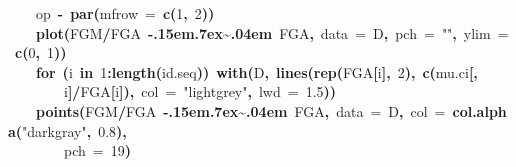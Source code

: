 \documentclass{article}
\makeatletter
\newcommand{\hlnumber}[1]{\textcolor[rgb]{0,0,0}{#1}}%
\newcommand{\hlfunctioncall}[1]{\textcolor[rgb]{.5,0,.33}{\textbf{#1}}}%
\newcommand{\hlstring}[1]{\textcolor[rgb]{.6,.6,1}{#1}}%
\newcommand{\hlkeyword}[1]{\textbf{#1}}%
\newcommand{\hlargument}[1]{\textcolor[rgb]{.69,.25,.02}{#1}}%
\newcommand{\hlassignement}[1]{\textbf{#1}}%
\newcommand{\hlsymbol}[1]{#1}%
\def\urltilda{\kern -.15em\lower .7ex\hbox{\~{}}\kern .04em}%
\newcommand{\hlstd}[1]{\textcolor[rgb]{0,0,0}{#1}}%
\newenvironment{kframe}{%
 \def\FrameCommand##1{\hskip\@totalleftmargin \hskip-\fboxsep
 \colorbox{shadecolor}{##1}\hskip-\fboxsep
     \hskip-\linewidth \hskip-\@totalleftmargin \hskip\columnwidth}%
 \MakeFramed {\advance\hsize-\width
   \@totalleftmargin\z@ \linewidth\hsize
   \@setminipage}}%
 {\par\unskip\endMakeFramed}
\newenvironment{knitrout}{}{} %
\makeatother
\begin{document}
\begin{knitrout}
{\begin{kframe}
\begin{flushleft}
\hlstd{}{\ }{\ }{\ }{\ }\hlsymbol{op}{\ }\hlassignement{\usebox{\hlnormalsizeboxlessthan}-}{\ }\hlfunctioncall{par}\hlkeyword{(}\hlargument{mfrow}{\ }\hlargument{=}{\ }\hlfunctioncall{c}\hlkeyword{(}\hlnumber{1}\hlkeyword{,}{\ }\hlnumber{2}\hlkeyword{)}\hlkeyword{)}\hspace*{\fill}\\
\hlstd{}{\ }{\ }{\ }{\ }\hlfunctioncall{plot}\hlkeyword{(}\hlsymbol{FGM}\hlkeyword{/}\hlsymbol{FGA}{\ }\hlkeyword{\urltilda{}}{\ }\hlsymbol{FGA}\hlkeyword{,}{\ }\hlargument{data}{\ }\hlargument{=}{\ }\hlsymbol{D}\hlkeyword{,}{\ }\hlargument{pch}{\ }\hlargument{=}{\ }\hlstring{""}\hlkeyword{,}{\ }\hlargument{ylim}{\ }\hlargument{=}{\ }\hlfunctioncall{c}\hlkeyword{(}\hlnumber{0}\hlkeyword{,}{\ }\hlnumber{1}\hlkeyword{)}\hlkeyword{)}\hspace*{\fill}\\
\hlstd{}{\ }{\ }{\ }{\ }\hlkeyword{for}{\ }\hlkeyword{(}\hlsymbol{i}{\ }\hlkeyword{in}{\ }\hlnumber{1}\hlkeyword{:}\hlfunctioncall{length}\hlkeyword{(}\hlsymbol{id.seq}\hlkeyword{)}\hlkeyword{)}{\ }\hlfunctioncall{with}\hlkeyword{(}\hlsymbol{D}\hlkeyword{,}{\ }\hlfunctioncall{lines}\hlkeyword{(}\hlfunctioncall{rep}\hlkeyword{(}\hlsymbol{FGA}\hlkeyword{[}\hlsymbol{i}\hlkeyword{]}\hlkeyword{,}{\ }\hlnumber{2}\hlkeyword{)}\hlkeyword{,}{\ }\hlfunctioncall{c}\hlkeyword{(}\hlsymbol{mu.ci}\hlkeyword{[}\hlkeyword{,}\hspace*{\fill}\\
\hlstd{}{\ }{\ }{\ }{\ }{\ }{\ }{\ }{\ }\hlsymbol{i}\hlkeyword{]}\hlkeyword{/}\hlsymbol{FGA}\hlkeyword{[}\hlsymbol{i}\hlkeyword{]}\hlkeyword{)}\hlkeyword{,}{\ }\hlargument{col}{\ }\hlargument{=}{\ }\hlstring{"lightgrey"}\hlkeyword{,}{\ }\hlargument{lwd}{\ }\hlargument{=}{\ }\hlnumber{1.5}\hlkeyword{)}\hlkeyword{)}\hspace*{\fill}\\
\hlstd{}{\ }{\ }{\ }{\ }\hlfunctioncall{points}\hlkeyword{(}\hlsymbol{FGM}\hlkeyword{/}\hlsymbol{FGA}{\ }\hlkeyword{\urltilda{}}{\ }\hlsymbol{FGA}\hlkeyword{,}{\ }\hlargument{data}{\ }\hlargument{=}{\ }\hlsymbol{D}\hlkeyword{,}{\ }\hlargument{col}{\ }\hlargument{=}{\ }\hlfunctioncall{col.alpha}\hlkeyword{(}\hlstring{"darkgray"}\hlkeyword{,}{\ }\hlnumber{0.8}\hlkeyword{)}\hlkeyword{,}\hspace*{\fill}\\
\hlstd{}{\ }{\ }{\ }{\ }{\ }{\ }{\ }{\ }\hlargument{pch}{\ }\hlargument{=}{\ }\hlnumber{19}\hlkeyword{)}\hspace*{\fill}\\

\end{flushleft}
\end{kframe}}
\end{knitrout}
\end{document}
